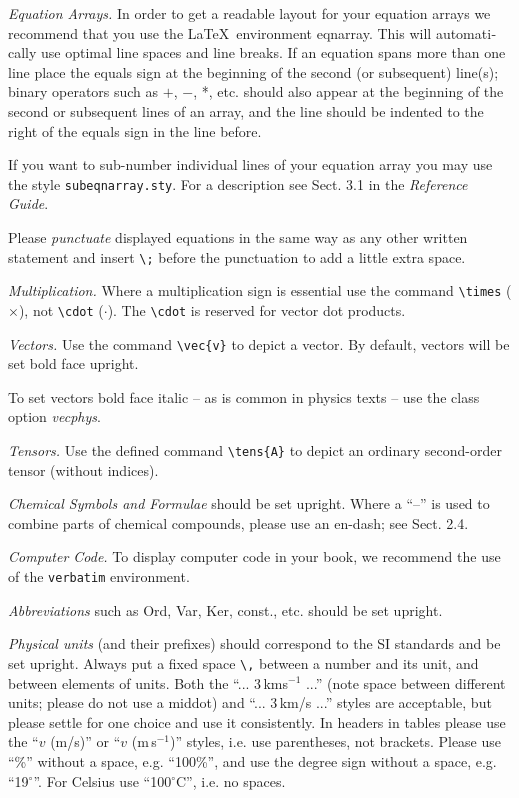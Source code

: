 \documentclass[graybox]{svmult}
\begin{document}
\begin{refguide}
\begin{sloppy}
{\it Equation Arrays.} In order to get a readable layout for your equation arrays we recommend that you use the \LaTeX~environment eqnarray. This will automati­cally use optimal line spaces and line breaks. If an equation spans more than one line place the equals sign at the beginning of the second (or subsequent) line(s); binary operators such as $+$, $-$, *, etc. should also appear at the beginning of the second or subsequent lines of an array, and the line should be indented to the right of the equals sign in the line before.

If you want to sub-number individual lines of your equation array you may use the style \verb|subeqnarray.sty|. For a description see Sect. 3.1 in the {\it Reference Guide}.

Please {\it punctuate} displayed equations in the same way as any other written statement and insert \verb|\;| before the punctuation to add a little extra space.


{\it Multiplication.} Where a multiplication sign is essential use the command \verb|\times| ($\times$), not \verb|\cdot| ($\cdot$). The \verb|\cdot| is reserved for vector dot products.

{\it Vectors.} Use the command \verb|\vec{v}| to depict a vector. By default, vectors will be set bold face upright.

To set vectors bold face italic -- as is common in physics texts -- use the class option {\it vecphys}.

{\it Tensors.} Use the defined command \verb|\tens{A}| to depict an ordinary second-order tensor (without indices).

{\it Chemical Symbols and Formulae} should be set upright. Where a ``--'' is used to combine parts of chemical compounds, please use an en-dash; see Sect. 2.4.

{\it Computer Code.} To display computer code in your book, we recommend the use of the \verb|verbatim| environment.

{\it Abbreviations} such as Ord, Var, Ker, const., etc. should be set upright.

{\it Physical units} (and their prefixes) should correspond to the SI standards and be set upright. Always put a fixed space \verb|\,| between a number and its unit, and between elements of units. Both the ``... 3\,kms$^{-1}$ ...'' (note space between different units; please do not use a middot) and ``... 3\,km/s ...'' styles are acceptable, but please settle for one choice and use it consistently. In headers in tables please use the ``$v$ (m/s)'' or ``$v$ (m\,s$^{-1}$)'' styles, i.e. use parentheses, not brackets. Please use ``\%'' without a space, e.g. ``100\%'', and use the degree sign without a space, e.g. ``19$^{\circ}$''. For Celsius use ``100$^{\circ}$C'', i.e. no spaces.


\end{sloppy}
\end{refguide}
\end{document}

